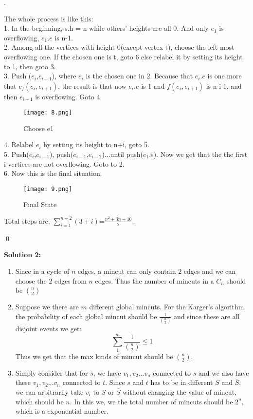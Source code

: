 \documentclass[12pt, notitlepage]{article}
\newenvironment{sol}
  {\par\vspace{3mm}\noindent{\it Solution}.}{\qed}
\begin{document}
\begin{sol}
\begin{enumerate}
The whole process is like this:\\
1. In the beginning, s.h = n while others' heights are all 0. And only $e_1$ is overflowing, $e_1.e$ is n-1.\\
2. Among all the vertices with height 0(except vertex t), choose the left-most overflowing one. If the chosen one is t, goto 6 else relabel it by setting its height to 1, then goto 3.\\
3. Push ($e_i$,$e_{i+1}$), where $e_i$ is the chosen one in 2. Because that $e_i.e$ is one more that $c_f(e_i,e_{i+1})$, the result is that now $e_i.e$ is 1 and $f(e_i,e_{i+1})$ is n-i-1, and then $e_{i+1}$ is overflowing. Goto 4.\\
	\begin{figure}[H]\centering
	\texttt{[image: 8.png]}
	\caption{Choose e1}
	\end{figure}
4. Relabel $e_i$ by setting its height to n+i, goto 5.\\
5. Push($e_i$,$e_{i-1}$), push($e_{i-1}$,$e_{i-2}$)...until push($e_1$,s). Now we get that the the first i vertices are not overflowing. Goto to 2.\\
6. Now this is the final situation.\\
	\begin{figure}[H]\centering
	\texttt{[image: 9.png]}
	\caption{Final State}
	\end{figure}
Total steps are: $\sum_{i=1}^{n-2}(3+i)$=$\frac{n^2+3n-10}{2}$.
\end{enumerate}
\end{sol}

\textbf{Solution 2:}\\
\begin{enumerate}[1.]
\item Since in a cycle of $n$ edges, a mincut can only contain $2$ edges
    and we can choose the $2$ edges from $n$ edges. Thus the number of
        mincuts in a $C_n$ should be $\binom{n}{2}$
\item Suppose we there are $m$ different global mincuts. For the Karger's algorithm, the probability of each global mincut
    should be $\frac{1}{\binom{n}{2}}$ and since these are all disjoint events we get:
        \[
            \sum_{1}^{m} \frac{1}{\binom{n}{2}} \leq 1
            \]
        Thus we get that the max kinds of mincut should be $\binom{n}{2}$.

\item Simply consider that for $s$, we have $v_1, v_2 \ldots v_n$ connected to $s$ and we also have these
    $v_1, v_2 \ldots v_n$ connected to $t$. Since $s$ and $t$ has to be in different $S$ and $\overline{S}$,
    we can arbitrarily take $v_i$ to $S$ or $\overline{S}$ without changing the value of mincut, which should be $n$.
    In this we, we the total number of mincuts should be $2^n$, which is a exponential number.
\end{enumerate}
\end{document}
